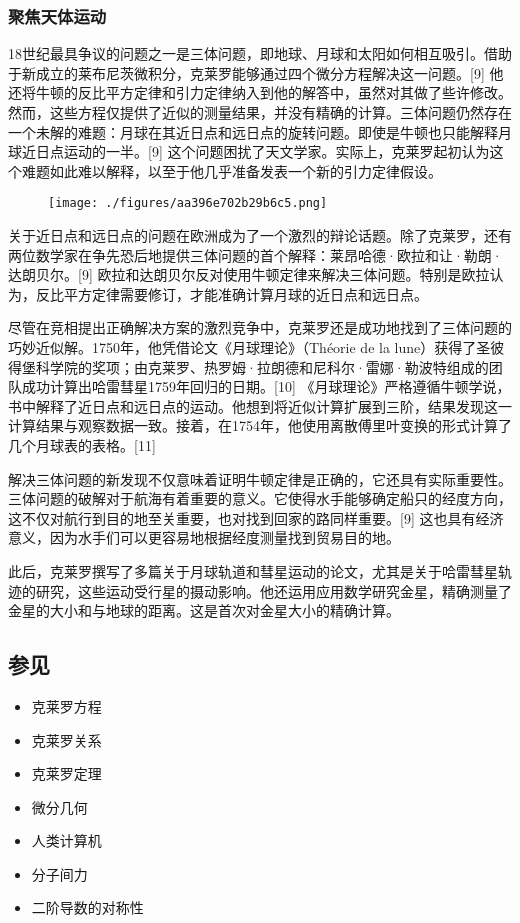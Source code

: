 \subsubsection{聚焦天体运动}  
18世纪最具争议的问题之一是三体问题，即地球、月球和太阳如何相互吸引。借助于新成立的莱布尼茨微积分，克莱罗能够通过四个微分方程解决这一问题。[9] 他还将牛顿的反比平方定律和引力定律纳入到他的解答中，虽然对其做了些许修改。然而，这些方程仅提供了近似的测量结果，并没有精确的计算。三体问题仍然存在一个未解的难题：月球在其近日点和远日点的旋转问题。即使是牛顿也只能解释月球近日点运动的一半。[9] 这个问题困扰了天文学家。实际上，克莱罗起初认为这个难题如此难以解释，以至于他几乎准备发表一个新的引力定律假设。
\begin{figure}[ht]
\centering
\texttt{[image: ./figures/aa396e702b29b6c5.png]}
\caption{} \label{fig_Alexis_3}
\end{figure}
关于近日点和远日点的问题在欧洲成为了一个激烈的辩论话题。除了克莱罗，还有两位数学家在争先恐后地提供三体问题的首个解释：莱昂哈德·欧拉和让·勒朗·达朗贝尔。[9] 欧拉和达朗贝尔反对使用牛顿定律来解决三体问题。特别是欧拉认为，反比平方定律需要修订，才能准确计算月球的近日点和远日点。

尽管在竞相提出正确解决方案的激烈竞争中，克莱罗还是成功地找到了三体问题的巧妙近似解。1750年，他凭借论文《月球理论》（Théorie de la lune）获得了圣彼得堡科学院的奖项；由克莱罗、热罗姆·拉朗德和尼科尔·雷娜·勒波特组成的团队成功计算出哈雷彗星1759年回归的日期。[10] 《月球理论》严格遵循牛顿学说，书中解释了近日点和远日点的运动。他想到将近似计算扩展到三阶，结果发现这一计算结果与观察数据一致。接着，在1754年，他使用离散傅里叶变换的形式计算了几个月球表的表格。[11]

解决三体问题的新发现不仅意味着证明牛顿定律是正确的，它还具有实际重要性。三体问题的破解对于航海有着重要的意义。它使得水手能够确定船只的经度方向，这不仅对航行到目的地至关重要，也对找到回家的路同样重要。[9] 这也具有经济意义，因为水手们可以更容易地根据经度测量找到贸易目的地。

此后，克莱罗撰写了多篇关于月球轨道和彗星运动的论文，尤其是关于哈雷彗星轨迹的研究，这些运动受行星的摄动影响。他还运用应用数学研究金星，精确测量了金星的大小和与地球的距离。这是首次对金星大小的精确计算。

\subsection{参见}  
\begin{itemize}
\item 克莱罗方程  
\item 克莱罗关系  
\item 克莱罗定理  
\item 微分几何  
\item 人类计算机  
\item 分子间力  
\item 二阶导数的对称性
\end{itemize}
